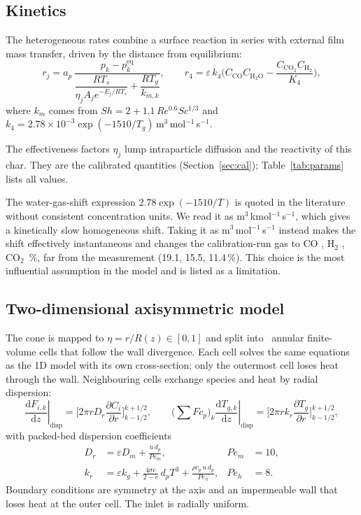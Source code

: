 \documentclass[11pt,a4paper]{article}
\newcommand{\dd}{\mathrm{d}}
\begin{document}
\subsection{Kinetics}\label{sec:kin}
The heterogeneous rates combine a surface reaction in series with external film mass transfer, driven by the distance from equilibrium:
\begin{equation}
r_j = a_p\,\frac{p_k - p_k^\text{eq}}{\dfrac{RT_s}{\eta_j A_j e^{-E_j/RT_s}} + \dfrac{RT_g}{k_{m,k}}}, \qquad
r_4 = \varepsilon\,k_4\Big(C_\text{CO}C_\text{H$_2$O}-\frac{C_\text{CO$_2$}C_\text{H$_2$}}{K_4}\Big),
\end{equation}
where $k_{m}$ comes from $Sh=2+1.1\,Re^{0.6}Sc^{1/3}$ and $k_4 = 2.78\times10^{-3}\exp(-1510/T_g)$\,m$^3$\,mol$^{-1}$\,s$^{-1}$.

The effectiveness factors $\eta_j$ lump intraparticle diffusion and the reactivity of this char. They are the calibrated quantities (Section~\ref{sec:cal}); Table~\ref{tab:params} lists all values.

The water-gas-shift expression $2.78\exp(-1510/T)$ is quoted in the literature without consistent concentration units. We read it as m$^3$\,kmol$^{-1}$\,s$^{-1}$, which gives a kinetically slow homogeneous shift. Taking it as m$^3$\,mol$^{-1}$\,s$^{-1}$ instead makes the shift effectively instantaneous and changes the calibration-run gas to CO \RWGSfastCO, H$_2$ \RWGSfastHtwo, CO$_2$ \RWGSfastCOtwo\,\%, far from the measurement (19.1, 15.5, 11.4\,\%). This choice is the most influential assumption in the model and is listed as a limitation.

\subsection{Two-dimensional axisymmetric model}
The cone is mapped to $\eta=r/R(z)\in[0,1]$ and split into \RTwoDcells\ annular finite-volume cells that follow the wall divergence. Each cell solves the same equations as the 1D model with its own cross-section; only the outermost cell loses heat through the wall. Neighbouring cells exchange species and heat by radial dispersion:
\begin{equation}
\left.\frac{\dd F_{i,k}}{\dd z}\right|_\text{disp} = \Big[2\pi r D_r\frac{\partial C_i}{\partial r}\Big]_{k-1/2}^{k+1/2},\qquad
\left.\Big(\sum F c_p\Big)_k\frac{\dd T_{g,k}}{\dd z}\right|_\text{disp} = \Big[2\pi r k_r\frac{\partial T_g}{\partial r}\Big]_{k-1/2}^{k+1/2},
\end{equation}
with packed-bed dispersion coefficients
\begin{align}
D_r &= \varepsilon D_m + \frac{u\,d_p}{Pe_m}, & Pe_m &= 10,\\
k_r &= \varepsilon k_g + \frac{4\sigma e}{2-e}\,d_p T^3 + \frac{\rho c_p\,u\,d_p}{Pe_h}, & Pe_h &= 8.
\end{align}
Boundary conditions are symmetry at the axis and an impermeable wall that loses heat at the outer cell. The inlet is radially uniform.
\end{document}
